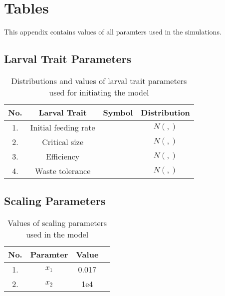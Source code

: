 \chapter{Tables}
This appendix contains values of all paramters used in the simulations.
\section{Larval Trait Parameters}
\begin{table}[h!]
  \centering
  \begin{tabular}{|c|c|c|c|}
    \hline
    \textbf{No.} & \textbf{Larval Trait} & \textbf{Symbol} & \textbf{Distribution} \\
    \hline
    1. & Initial feeding rate & & $N(,)$ \\
    \hline
    2. & Critical size & & $N(,)$ \\
    \hline
    3. & Efficiency & & $N(,)$ \\
    \hline
    4. & Waste tolerance & & $N(,)$ \\
    \hline
  \end{tabular}
  \caption{Distributions and values of larval trait parameters used for initiating the model}
  \label{tab:trait_value}
\end{table}
\section{Scaling Parameters}
\begin{table}[h!]
  \centering
  \begin{tabular}{|c|c|c|c|}
    \hline
    \textbf{No.} & \textbf{Paramter} & \textbf{Value} \\
    \hline
    1. & $x_{1}$ & 0.017 \\
    \hline
    2. & $x_{2}$ & 1e4 \\
    \hline
  \end{tabular}
  \caption{Values of scaling parameters used in the model}
  \label{tab:scale_param}
\end{table}
\newpage
